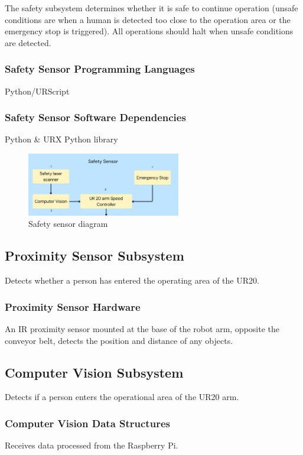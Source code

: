 
The safety subsystem determines whether it is safe to continue operation (unsafe conditions are when a human is detected too close to the operation area or the emergency stop is triggered). All operations should halt when unsafe conditions are detected.

\subsubsection{Safety Sensor Programming Languages}
Python/URScript

\subsubsection{Safety Sensor Software Dependencies}
Python \& URX Python library

\begin{figure}[h!]
	\centering
 	\includegraphics[width=0.60\textwidth]{images/safety.png}
 \caption{Safety sensor diagram}
\end{figure}

\subsection{Proximity Sensor Subsystem}
Detects whether a person has entered the operating area of the UR20. 

\subsubsection{Proximity Sensor Hardware}
An IR proximity sensor mounted at the base of the robot arm, opposite the conveyor belt, detects the position and distance of any objects.

\subsection{Computer Vision Subsystem}
Detects if a person enters the operational area of the UR20 arm.

\subsubsection{Computer Vision Data Structures}
Receives data processed from the Raspberry Pi.

